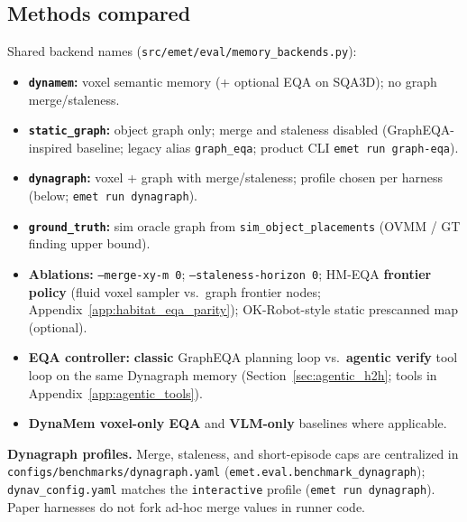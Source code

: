 \subsection{Methods compared}

Shared backend names (\texttt{src/emet/eval/memory\_backends.py}):

\begin{itemize}
  \item \textbf{\texttt{dynamem}:} voxel semantic memory (+ optional EQA on SQA3D); no graph merge/staleness.
  \item \textbf{\texttt{static\_graph}:} object graph only; merge and staleness disabled (GraphEQA-inspired baseline; legacy alias \texttt{graph\_eqa}; product CLI \texttt{emet run graph-eqa}).
  \item \textbf{\texttt{dynagraph}:} voxel + graph with merge/staleness; profile chosen per harness (below; \texttt{emet run dynagraph}).
  \item \textbf{\texttt{ground\_truth}:} sim oracle graph from \texttt{sim\_object\_placements} (OVMM / GT finding upper bound).
  \item \textbf{Ablations:} \texttt{--merge-xy-m 0}; \texttt{--staleness-horizon 0}; HM-EQA \textbf{frontier policy} (fluid voxel sampler vs.\ graph frontier nodes; Appendix~\ref{app:habitat_eqa_parity}); OK-Robot-style static prescanned map (optional).
  \item \textbf{EQA controller:} \textbf{classic} GraphEQA planning loop vs.\ \textbf{agentic verify} tool loop on the same Dynagraph memory (Section~\ref{sec:agentic_h2h}; tools in Appendix~\ref{app:agentic_tools}).
  \item \textbf{DynaMem voxel-only EQA} and \textbf{VLM-only} baselines where applicable.
\end{itemize}

\textbf{Dynagraph profiles.}
Merge, staleness, and short-episode caps are centralized in \texttt{configs/benchmarks/dynagraph.yaml} (\texttt{emet.eval.benchmark\_dynagraph}); \texttt{dynav\_config.yaml} matches the \texttt{interactive} profile (\texttt{emet run dynagraph}).
Paper harnesses do not fork ad-hoc merge values in runner code.

